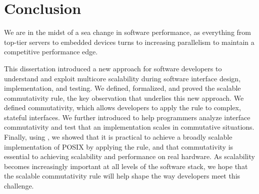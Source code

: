 \section{Conclusion}
\label{sec:concl}


We are in the midst of a sea change in software performance, as
everything from top-tier servers to embedded devices turns to
increasing parallelism to maintain a competitive performance edge.

This dissertation introduced a new approach for software developers to
understand and exploit multicore scalability during software interface
design, implementation, and testing.
%
We defined, formalized, and proved the scalable commutativity rule,
the key observation that underlies this new approach.
%
We defined \SIM commutativity, which allows developers to apply the
rule to complex, stateful interfaces.
%
We further introduced \tool to help programmers analyze interface
commutativity and test that an implementation scales in commutative
situations.
%
Finally, using \sys, we showed that it is practical to achieve a
broadly scalable implementation of POSIX by applying the rule, and
that commutativity is essential to achieving scalability and
performance on real hardware.
%
As scalability becomes increasingly important at all levels of the
software stack, we hope that the scalable commutativity rule will help
shape the way developers meet this challenge.







